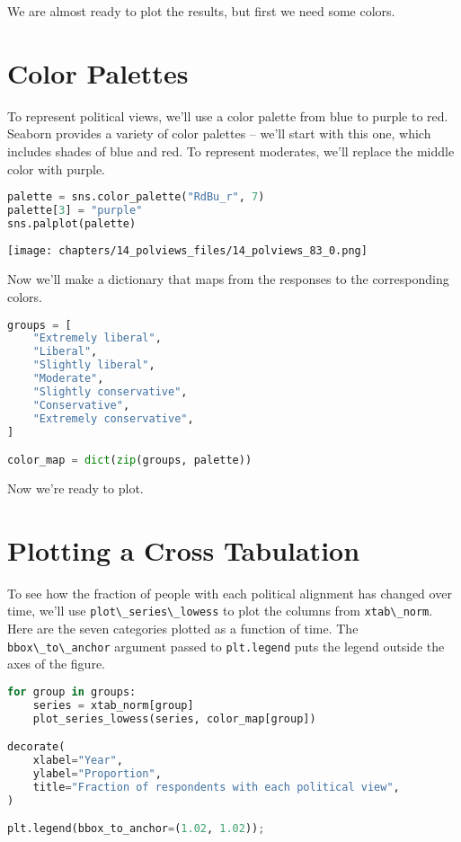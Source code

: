We are almost ready to plot the results, but first we need some colors.

\section{Color Palettes}\label{color-palettes}

To represent political views, we'll use a color palette from blue to
purple to red. Seaborn provides a variety of color palettes -- we'll
start with this one, which includes shades of blue and red. To represent
moderates, we'll replace the middle color with purple.

\begin{lstlisting}[language=Python,style=source]
palette = sns.color_palette("RdBu_r", 7)
palette[3] = "purple"
sns.palplot(palette)
\end{lstlisting}

\begin{center}
\texttt{[image: chapters/14\_polviews\_files/14\_polviews\_83\_0.png]}
\end{center}

Now we'll make a dictionary that maps from the responses to the
corresponding colors.

\begin{lstlisting}[language=Python,style=source]
groups = [
    "Extremely liberal",
    "Liberal",
    "Slightly liberal",
    "Moderate",
    "Slightly conservative",
    "Conservative",
    "Extremely conservative",
]

color_map = dict(zip(groups, palette))
\end{lstlisting}

Now we're ready to plot.

\section{Plotting a Cross Tabulation}\label{plotting-a-cross-tabulation}

To see how the fraction of people with each political alignment has
changed over time, we'll use
\passthrough{\lstinline!plot\_series\_lowess!} to plot the columns from
\passthrough{\lstinline!xtab\_norm!}. Here are the seven categories
plotted as a function of time. The
\passthrough{\lstinline!bbox\_to\_anchor!} argument passed to
\passthrough{\lstinline!plt.legend!} puts the legend outside the axes of
the figure.

\begin{lstlisting}[language=Python,style=source]
for group in groups:
    series = xtab_norm[group]
    plot_series_lowess(series, color_map[group])

decorate(
    xlabel="Year",
    ylabel="Proportion",
    title="Fraction of respondents with each political view",
)

plt.legend(bbox_to_anchor=(1.02, 1.02));
\end{lstlisting}

